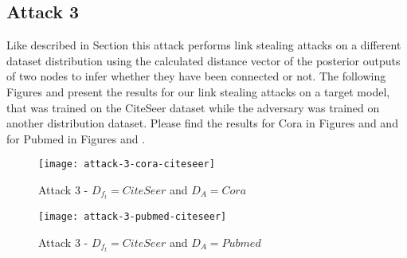         \subsection*{Attack 3}
            Like described in Section  this attack performs link stealing attacks on a different dataset distribution using the calculated distance vector of the posterior outputs of two nodes to infer whether they have been connected or not. 
            The following Figures  and  present the results for our link stealing attacks on a target model, that was trained on the CiteSeer dataset while the adversary was trained on another distribution dataset.
            Please find the results for Cora in Figures  and  and for Pubmed in Figures  and .

            \begin{figure}[h]
                \begin{center}
                    \texttt{[image: attack-3-cora-citeseer]}
                    \caption{Attack 3 - $D_{f_t} = CiteSeer$ and $D_A = Cora$}
                    \label{figure:eval-att3-cora-citeseer}
                \end{center}
            \end{figure}

            \begin{figure}[h]
                \begin{center}
                    \texttt{[image: attack-3-pubmed-citeseer]}
                    \caption{Attack 3 - $D_{f_t} = CiteSeer$ and $D_A = Pubmed$}
                    \label{figure:eval-att3-pubmed-citeseer}
                \end{center}
            \end{figure}

